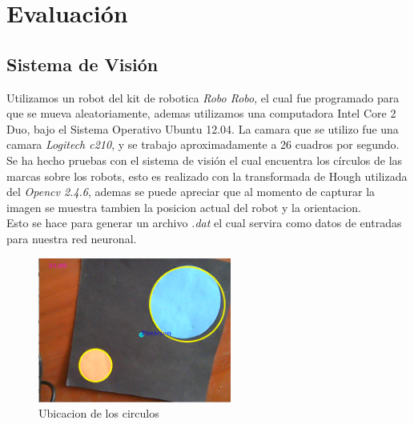 
\chapter{Evaluaci\'on}
\section{Sistema de Visi\'on}
Utilizamos un robot del kit de robotica \textit{Robo Robo},  el cual fue programado para que se mueva aleatoriamente, ademas utilizamos una computadora Intel Core 2 Duo, bajo el Sistema Operativo Ubuntu 12.04. La camara que se utilizo fue una camara \textit{Logitech c210}, y se trabajo aproximadamente a 26 cuadros por segundo.\\
Se ha hecho pruebas con el sistema de visi\'on el cual encuentra los c\'irculos de las marcas sobre los robots, esto es realizado con la transformada de Hough utilizada del \textit{Opencv 2.4.6}, ademas se puede apreciar que al momento de capturar la imagen se muestra tambien la posicion actual del robot y la orientacion.\\
 Esto se hace para generar un archivo \textit{.dat} el cual servira como datos de entradas para nuestra red neuronal.
\begin{figure}
	\centering
	\includegraphics[width=2.5in]{visi.pdf}
	
	\caption{Ubicacion de los circulos}
	\label{fig_mar}
\end{figure}
